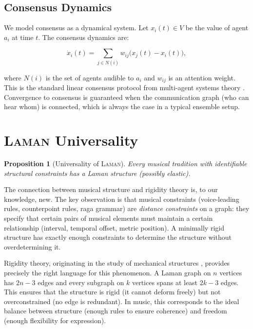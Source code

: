 \documentclass[cmj]{article}
\newtheorem{proposition}{Proposition}
\newcommand{\LAMAN}{\textsc{Laman}}
\begin{document}
\subsection{Consensus Dynamics}

We model consensus as a dynamical system. Let $x_i(t) \in V$ be the value of
agent $a_i$ at time $t$. The consensus dynamics are:

\begin{equation}
  \dot{x}_i(t) = \sum_{j \in N(i)} w_{ij} \bigl(x_j(t) - x_i(t)\bigr),
  \label{eq:consensus-dynamics}
\end{equation}

where $N(i)$ is the set of agents audible to $a_i$ and $w_{ij}$ is an
attention weight. This is the standard linear consensus protocol from
multi-agent systems theory \citep{olfati2004consensus}. Convergence to
consensus is guaranteed when the communication graph (who can hear whom) is
connected, which is always the case in a typical ensemble setup.

\section{\LAMAN{} Universality}
\label{sec:laman-sec}

\begin{proposition}[Universality of \LAMAN{}]
Every musical tradition with identifiable structural constraints has a Laman
structure (possibly elastic).
\end{proposition}

The connection between musical structure and rigidity theory is, to our
knowledge, new. The key observation is that musical constraints (voice-leading
rules, counterpoint rules, raga grammar) are \emph{distance constraints} on a
graph: they specify that certain pairs of musical elements must maintain a
certain relationship (interval, temporal offset, metric position). A
minimally rigid structure has exactly enough constraints to determine the
structure without overdetermining it.

Rigidity theory, originating in the study of mechanical structures
\citep{laman1970graphs}, provides precisely the right language for this
phenomenon. A Laman graph on $n$ vertices has $2n - 3$ edges and every
subgraph on $k$ vertices spans at least $2k - 3$ edges. This ensures that the
structure is rigid (it cannot deform freely) but not overconstrained (no edge
is redundant). In music, this corresponds to the ideal balance between
structure (enough rules to ensure coherence) and freedom (enough flexibility
for expression).
\end{document}
